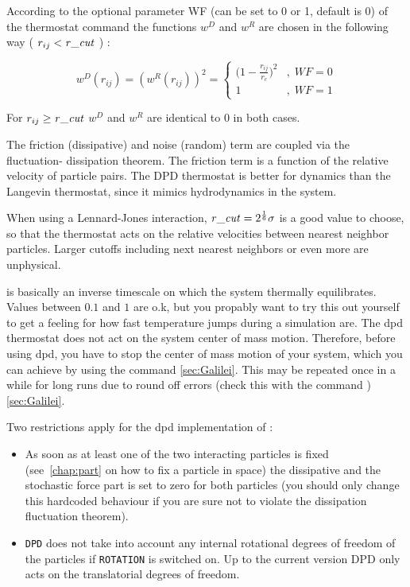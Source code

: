 According to the optional parameter WF (can be set to 0 or 1, default
is 0) of the thermostat command the functions $w^D$ and $w^R$ are
chosen in the following way ( $ r_{ij} < \mathrm{\mathit{r\_cut}} $ ) :

$$ 
w^D (r_{ij}) = ( w^R (r_{ij})) ^2 = 
   \left\{
   \begin{array}{clcr} 
             {( 1 - \frac{r_{ij}}{r_c}} )^2 & , \; WF = 0 \\
             1                      & , \; WF = 1
   \end{array}
   \right.
$$

For $ r_{ij} \ge \mathrm{\mathit{r\_cut}} $  $w^D$ and $w^R$ are identical to 0 in both cases.

The friction (dissipative) and noise (random) term are coupled via the
fluctuation- dissipation theorem. The friction term is a function of
the relative velocity of particle pairs.  The DPD thermostat is better
for dynamics than the Langevin thermostat, since it mimics
hydrodynamics in the system.

When using a Lennard-Jones interaction, $\mathrm{\mathit{r\_cut}} =
2^{\frac{1}{6}} \sigma$ is a good value to choose, so that the
thermostat acts on the relative velocities between nearest neighbor
particles.  Larger cutoffs including next nearest neighbors or even
more are unphysical.

 is basically an inverse timescale on which the system
thermally equilibrates.  Values between $0.1$ and $1$ are o.k, but you
propably want to try this out yourself to get a feeling for how fast
temperature jumps during a simulation are. The dpd thermostat does not
act on the system center of mass motion.  Therefore, before using dpd,
you have to stop the center of mass motion of your system, which you
can achieve by using the command  
\ref{sec:Galilei}. This may be repeated once in a while for long 
runs due to round off errors (check this with the command 
) \ref{sec:Galilei}.

Two restrictions apply for the dpd implementation of \es:

\begin{itemize}
\item As soon as at least one of the two interacting particles is
  fixed (see~\ref{chap:part} on how to fix a particle in space) the
  dissipative and the stochastic force part is set to zero for both
  particles (you should only change this hardcoded behaviour if you
  are sure not to violate the dissipation fluctuation theorem).
\item \texttt{DPD} does not take into account any internal rotational
  degrees of freedom of the particles if \texttt{ROTATION} is switched
  on. Up to the current version DPD only acts on the translatorial
  degrees of freedom.
\end{itemize}

